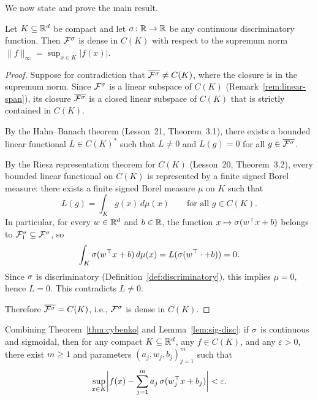 \documentclass[11pt,a4paper]{article}
\begin{document}
We now state and prove the main result.

\begin{theorem}[Cybenko, 1989]
\label{thm:cybenko}
Let $K \subseteq \mathbb{R}^d$ be compact and let $\sigma \colon \mathbb{R} \to \mathbb{R}$ be
any continuous discriminatory function.  Then $\mathcal{F}^{\sigma}$ is dense
in $C(K)$ with respect to the supremum norm $\|f\|_\infty = \sup_{x \in K}
|f(x)|$.
\end{theorem}

\begin{proof}
Suppose for contradiction that $\overline{\mathcal{F}^{\sigma}} \neq C(K)$,
where the closure is in the supremum norm.  Since $\mathcal{F}^{\sigma}$ is
a linear subspace of $C(K)$ (Remark~\ref{rem:linear-span}), its closure
$\overline{\mathcal{F}^{\sigma}}$ is a closed linear subspace of $C(K)$ that
is strictly contained in $C(K)$.

By the Hahn--Banach theorem (Lesson~21, Theorem~3.1), there exists a
bounded linear functional $L \in C(K)^*$ such that $L \neq 0$ and
$L(g) = 0$ for all $g \in \overline{\mathcal{F}^{\sigma}}$.

By the Riesz representation theorem for $C(K)$ (Lesson~20, Theorem~3.2),
every bounded linear functional on $C(K)$ is represented by a finite signed
Borel measure: there exists a finite signed Borel measure $\mu$ on $K$ such
that
\[
  L(g) = \int_K g(x) \, d\mu(x)
  \qquad \text{for all } g \in C(K).
\]
In particular, for every $w \in \mathbb{R}^d$ and $b \in \mathbb{R}$, the function
$x \mapsto \sigma(w^\top x + b)$ belongs to $\mathcal{F}_1^{\sigma}
\subseteq \mathcal{F}^{\sigma}$, so
\[
  \int_K \sigma(w^\top x + b) \, d\mu(x) = L(\sigma(w^\top \cdot + b))
  = 0.
\]
Since $\sigma$ is discriminatory (Definition~\ref{def:discriminatory}),
this implies $\mu = 0$, hence $L = 0$.  This contradicts $L \neq 0$.

Therefore $\overline{\mathcal{F}^{\sigma}} = C(K)$, i.e.,
$\mathcal{F}^{\sigma}$ is dense in $C(K)$.
\end{proof}

\begin{keyresult}[title={Cybenko's Universal Approximation Theorem}]
Combining Theorem~\ref{thm:cybenko} and Lemma~\ref{lem:sig-disc}: if
$\sigma$ is continuous and sigmoidal, then for any compact $K \subseteq
\mathbb{R}^d$, any $f \in C(K)$, and any $\varepsilon > 0$, there exist $m \ge 1$
and parameters $(a_j, w_j, b_j)_{j=1}^m$ such that
\[
  \sup_{x \in K}
  \biggl| f(x) - \sum_{j=1}^{m} a_j \, \sigma(w_j^\top x + b_j) \biggr|
  < \varepsilon.
\]
\end{keyresult}
\end{document}
